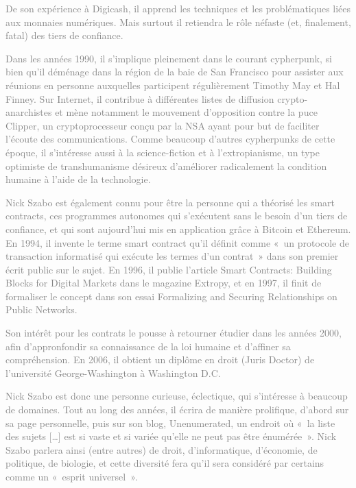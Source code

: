 \textcolor{gray}{De son expérience à Digicash, il apprend les techniques et les problématiques liées aux monnaies numériques. Mais surtout il retiendra le rôle néfaste (et, finalement, fatal) des tiers de confiance.}

\textcolor{gray}{Dans les années 1990, il s'implique pleinement dans le courant cypherpunk, si bien qu'il déménage dans la région de la baie de San Francisco pour assister aux réunions en personne auxquelles participent régulièrement Timothy May et Hal Finney. Sur Internet, il contribue à différentes listes de diffusion crypto-anarchistes et mène notamment le mouvement d'opposition contre la puce Clipper, un cryptoprocesseur conçu par la NSA ayant pour but de faciliter l'écoute des communications. Comme beaucoup d'autres cypherpunks de cette époque, il s'intéresse aussi à la science-fiction et à l'extropianisme, un type optimiste de transhumanisme désireux d'améliorer radicalement la condition humaine à l'aide de la technologie.}

\textcolor{gray}{Nick Szabo est également connu pour être la personne qui a théorisé les smart contracts, ces programmes autonomes qui s'exécutent sans le besoin d'un tiers de confiance, et qui sont aujourd'hui mis en application grâce à Bitcoin et Ethereum. En 1994, il invente le terme smart contract qu'il définit comme «~un protocole de transaction informatisé qui exécute les termes d'un contrat~» dans son premier écrit public sur le sujet. En 1996, il publie l'article Smart Contracts: Building Blocks for Digital Markets dans le magazine Extropy, et en 1997, il finit de formaliser le concept dans son essai Formalizing and Securing Relationships on Public Networks.}

\textcolor{gray}{Son intérêt pour les contrats le pousse à retourner étudier dans les années 2000, afin d'appronfondir sa connaissance de la loi humaine et d'affiner sa compréhension. En 2006, il obtient un diplôme en droit (Juris Doctor) de l'université George-Washington à Washington D.C.}

\textcolor{gray}{Nick Szabo est donc une personne curieuse, éclectique, qui s'intéresse à beaucoup de domaines. Tout au long des années, il écrira de manière prolifique, d'abord sur sa page personnelle, puis sur son blog, Unenumerated, un endroit où «~la liste des sujets […] est si vaste et si variée qu'elle ne peut pas être énumérée~». Nick Szabo parlera ainsi (entre autres) de droit, d'informatique, d'économie, de politique, de biologie, et cette diversité fera qu'il sera considéré par certains comme un «~esprit universel~».}

